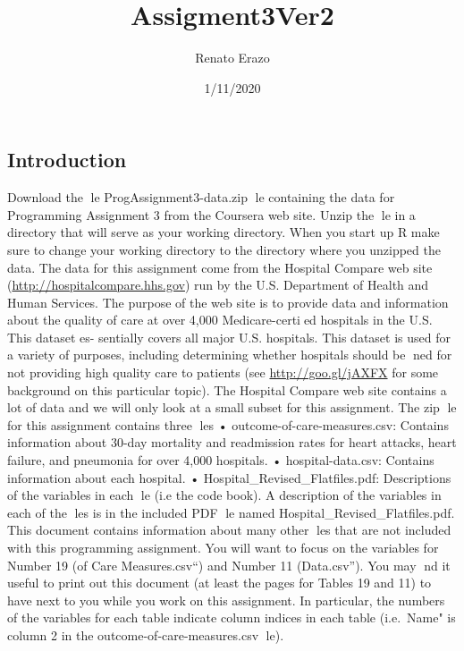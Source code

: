 \documentclass[
]{article}
\title{Assigment3Ver2}
\author{Renato Erazo}
\date{1/11/2020}
\begin{document}
\maketitle

\hypertarget{introduction}{%
\subsection{Introduction}\label{introduction}}

Download the le ProgAssignment3-data.zip le containing the data for
Programming Assignment 3 from the Coursera web site. Unzip the le in a
directory that will serve as your working directory. When you start up R
make sure to change your working directory to the directory where you
unzipped the data. The data for this assignment come from the Hospital
Compare web site (\url{http://hospitalcompare.hhs.gov}) run by the U.S.
Department of Health and Human Services. The purpose of the web site is
to provide data and information about the quality of care at over 4,000
Medicare-certied hospitals in the U.S. This dataset es- sentially
covers all major U.S. hospitals. This dataset is used for a variety of
purposes, including determining whether hospitals should be ned for not
providing high quality care to patients (see \url{http://goo.gl/jAXFX}
for some background on this particular topic). The Hospital Compare web
site contains a lot of data and we will only look at a small subset for
this assignment. The zip le for this assignment contains three les •
outcome-of-care-measures.csv: Contains information about 30-day
mortality and readmission rates for heart attacks, heart failure, and
pneumonia for over 4,000 hospitals. • hospital-data.csv: Contains
information about each hospital. • Hospital\_Revised\_Flatfiles.pdf:
Descriptions of the variables in each le (i.e the code book). A
description of the variables in each of the les is in the included PDF
le named Hospital\_Revised\_Flatfiles.pdf. This document contains
information about many other les that are not included with this
programming assignment. You will want to focus on the variables for
Number 19 (\Outcome of Care Measures.csv``) and Number 11
(\Hospital Data.csv''). You may nd it useful to print out this document
(at least the pages for Tables 19 and 11) to have next to you while you
work on this assignment. In particular, the numbers of the variables for
each table indicate column indices in each table (i.e.~\Hospital Name"
is column 2 in the outcome-of-care-measures.csv le).
\end{document}
